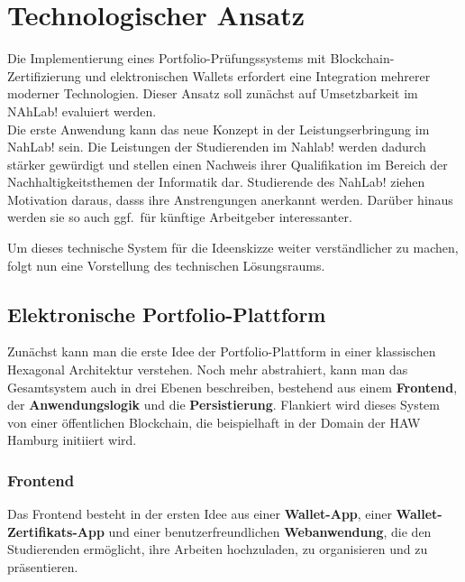 \documentclass[conference]{IEEEtran}
\begin{document}
\section{Technologischer Ansatz}
Die Implementierung eines Portfolio-Prüfungssystems mit Blockchain-Zertifizierung und elektronischen Wallets erfordert eine Integration mehrerer moderner Technologien. Dieser Ansatz soll zunächst auf Umsetzbarkeit im NAhLab! evaluiert werden.\\ Die erste Anwendung kann das neue Konzept in der Leistungserbringung im NahLab! sein.
Die Leistungen der Studierenden im Nahlab! werden dadurch stärker gewürdigt und stellen einen Nachweis ihrer Qualifikation im Bereich der Nachhaltigkeitsthemen der Informatik dar. Studierende des NahLab! ziehen Motivation daraus, dasss ihre Anstrengungen anerkannt werden.
Darüber hinaus werden sie so auch ggf.~für künftige Arbeitgeber interessanter.

Um dieses technische System für die Ideenskizze weiter verständlicher zu machen, folgt nun eine Vorstellung des  technischen Lösungsraums.

\subsection{Elektronische Portfolio-Plattform}
Zunächst kann man die erste Idee der Portfolio-Plattform in einer klassischen Hexagonal Architektur \cite{tanenbaum2017distributed} verstehen. Noch mehr abstrahiert, kann man das Gesamtsystem auch in drei Ebenen beschreiben, bestehend aus einem \textbf{Frontend}, der \textbf{Anwendungslogik} und die \textbf{Persistierung}. Flankiert wird dieses System von einer öffentlichen Blockchain, die beispielhaft in der Domain der HAW Hamburg initiiert wird. 

\subsubsection{Frontend}
Das Frontend besteht in der ersten Idee aus einer \textbf{Wallet-App}, einer \textbf{Wallet-Zertifikats-App} und einer benutzerfreundlichen \textbf{Webanwendung}, die den Studierenden ermöglicht, ihre Arbeiten hochzuladen, zu organisieren und zu präsentieren. 
\end{document}
